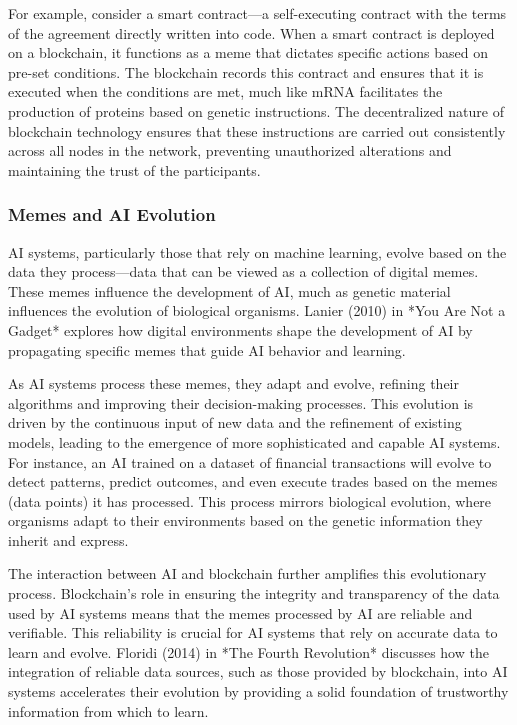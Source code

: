 \documentclass[12pt,twoside]{article}
\begin{document}
For example, consider a smart contract—a self-executing contract with the terms of the agreement directly written into code. When a smart contract is deployed on a blockchain, it functions as a meme that dictates specific actions based on pre-set conditions. The blockchain records this contract and ensures that it is executed when the conditions are met, much like mRNA facilitates the production of proteins based on genetic instructions. The decentralized nature of blockchain technology ensures that these instructions are carried out consistently across all nodes in the network, preventing unauthorized alterations and maintaining the trust of the participants.

\subsubsection{Memes and AI Evolution}

AI systems, particularly those that rely on machine learning, evolve based on the data they process—data that can be viewed as a collection of digital memes. These memes influence the development of AI, much as genetic material influences the evolution of biological organisms. Lanier (2010) in *You Are Not a Gadget* explores how digital environments shape the development of AI by propagating specific memes that guide AI behavior and learning.

As AI systems process these memes, they adapt and evolve, refining their algorithms and improving their decision-making processes. This evolution is driven by the continuous input of new data and the refinement of existing models, leading to the emergence of more sophisticated and capable AI systems. For instance, an AI trained on a dataset of financial transactions will evolve to detect patterns, predict outcomes, and even execute trades based on the memes (data points) it has processed. This process mirrors biological evolution, where organisms adapt to their environments based on the genetic information they inherit and express.

The interaction between AI and blockchain further amplifies this evolutionary process. Blockchain’s role in ensuring the integrity and transparency of the data used by AI systems means that the memes processed by AI are reliable and verifiable. This reliability is crucial for AI systems that rely on accurate data to learn and evolve. Floridi (2014) in *The Fourth Revolution* discusses how the integration of reliable data sources, such as those provided by blockchain, into AI systems accelerates their evolution by providing a solid foundation of trustworthy information from which to learn.
\end{document}
